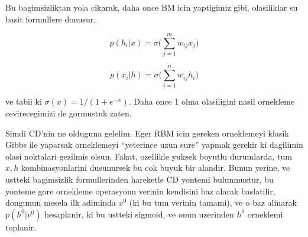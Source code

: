 \documentclass[12pt,fleqn]{article}\usepackage{../common}
\begin{document}
Bu bagimsizliktan yola cikarak, daha once BM icin yaptigimiz gibi,
olasiliklar su basit formullere donusur,

$$ p(h_i|x) = \sigma \bigg( \sum _{j=1}^{m} w_{ij} x_j \bigg) $$

$$ p(x_i|h) = \sigma \bigg( \sum _{i=1}^{n} w_{ij} h_i \bigg) $$

ve tabii ki $\sigma(x) = 1 / (1+e^{-x})$. Daha once 1 olma olasiligini
nasil ornekleme cevirecegimizi de gormustuk zaten. 

Simdi CD'nin ne olduguna gelelim. Eger RBM icin gereken orneklemeyi klasik
Gibbs ile yaparsak orneklemeyi ``yeterince uzun sure'' yapmak gerekir ki
dagilimin olasi noktalari gezilmis olsun. Fakat, ozellikle yuksek boyutlu
durumlarda, tum $x,h$ kombinasyonlarini dusunursek bu cok buyuk bir
alandir. Bunun yerine, ve ustteki bagimsizlik formullerinden hareketle CD
yontemi bulunmustur, bu yonteme gore ornekleme operasyonu verinin kendisini
baz alarak baslatilir, dongunun mesela ilk adiminda $x^0$ (ki bu tum
verinin tamami), ve o baz alinarak $p(h^0|v^0)$ hesaplanir, ki bu ustteki
sigmoid, ve onun uzerinden $h^0$ orneklemi toplanir. 














\inputminted[fontsize=\footnotesize]{python}{rbm.py}
\end{document}
